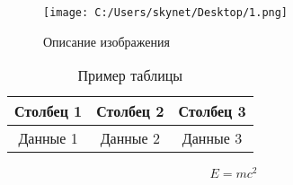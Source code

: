 \documentclass[14pt]{extreport}
\begin{document}
	\begin{figure}[h]
		\centering
		\texttt{[image: C:/Users/skynet/Desktop/1.png]}
		\caption{Описание изображения}
		\label{fig:example}
	\end{figure}
	
	\begin{table}[h]
		\centering
		\begin{tabular}{|c|c|c|}
			\hline
			Столбец 1 & Столбец 2 & Столбец 3 \\
			\hline
			Данные 1 & Данные 2 & Данные 3 \\
			\hline
		\end{tabular}
		\caption{Пример таблицы}
		\label{tab:example}
	\end{table}
	
	\begin{equation}
		E = mc^2
	\end{equation}
	
\end{document}
